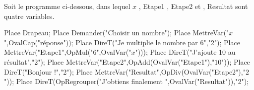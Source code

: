 \begin{exercice*}
    Soit le programme ci-dessous, dans lequel \og{} $x$ \fg{}, \og{} Etape1 \fg{}, \og{} Etape2 \fg{} et , \og{} Resultat \fg{} sont quatre variables.

    \begin{minipage}{0.6\linewidth}
        \begin{Scratch}[Echelle=0.7]
            Place Drapeau;
            Place Demander("Choisir un nombre");
            Place MettreVar("$x$",OvalCap("réponse"));
            Place DireT("Je multiplie le nombre par $6$","2");
            Place MettreVar("Etape1",OpMul("$6$",OvalVar("$x$")));
            Place DireT("J'ajoute 10 au résultat","2");
            Place MettreVar("Etape2",OpAdd(OvalVar("Etape1"),"$10$"));
            Place DireT("Bonjour !","2");
            Place MettreVar("Resultat",OpDiv(OvalVar("Etape2"),"$2$"));
            Place DireT(OpRegrouper("J'obtiens finalement ",OvalVar("Resultat")),"2");
        \end{Scratch}
    \end{minipage}    
    \begin{minipage}{0.35\linewidth}
        \vspace*{-25mm}
\end{minipage}
\end{exercice*}
